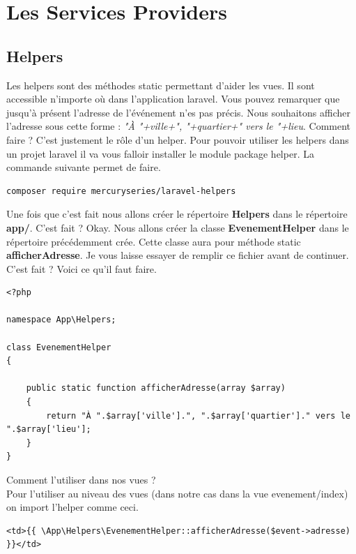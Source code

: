 \documentclass[12pt,a4paper]{article}
\begin{document}
\section{Les Services Providers}

\subsection{Helpers}
Les helpers sont des méthodes static permettant d'aider les vues. Il sont accessible n'importe où dans
l'application laravel.
Vous pouvez remarquer que jusqu’à  présent l'adresse de l'événement n'es pas précis.
Nous souhaitons afficher l'adresse sous cette forme : \textit{"À "+ville+", "+quartier+" vers le "+lieu}. Comment faire ? C'est justement le rôle d'un helper.
Pour pouvoir utiliser les helpers dans un projet laravel il va vous falloir installer le module package 
helper. La commande suivante permet de faire.
\begin{verbatim}
composer require mercuryseries/laravel-helpers
\end{verbatim}
Une fois que c'est fait nous allons créer le répertoire \textbf{Helpers} dans le répertoire
\textbf{app/}. C'est fait ? Okay. Nous allons créer la classe \textbf{EvenementHelper} dans le répertoire précédemment crée.  Cette classe aura pour méthode static \textbf{afficherAdresse}.
Je vous laisse essayer de remplir ce fichier avant de continuer. C'est fait ? Voici ce qu'il faut faire.

\begin{verbatim}
<?php

namespace App\Helpers;

class EvenementHelper
{
    
    public static function afficherAdresse(array $array)
    {
        return "À ".$array['ville'].", ".$array['quartier']." vers le ".$array['lieu'];
    }
}
\end{verbatim}

Comment l'utiliser dans nos vues ?\\
Pour l'utiliser au niveau des vues (dans notre cas dans la vue evenement/index) on import l'helper comme
ceci.
\begin{verbatim}
<td>{{ \App\Helpers\EvenementHelper::afficherAdresse($event->adresse) }}</td>
\end{verbatim}
\end{document}
